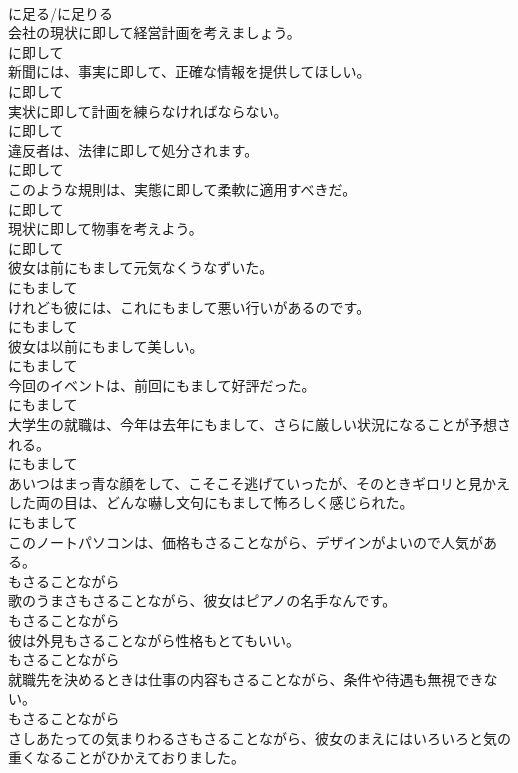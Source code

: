 \documentclass[8pt]{extreport}
\begin{document}
\begin{CJK}{UTF8}{min}
\\	に足る/に足りる	
\\	会社の現状に即して経営計画を考えましょう。	
\\	に即して	
\\	新聞には、事実に即して、正確な情報を提供してほしい。	
\\	に即して	
\\	実状に即して計画を練らなければならない。	
\\	に即して	
\\	違反者は、法律に即して処分されます。	
\\	に即して	
\\	このような規則は、実態に即して柔軟に適用すべきだ。	
\\	に即して	
\\	現状に即して物事を考えよう。	
\\	に即して	
\\	彼女は前にもまして元気なくうなずいた。	
\\	にもまして	
\\	けれども彼には、これにもまして悪い行いがあるのです。	
\\	にもまして	
\\	彼女は以前にもまして美しい。	
\\	にもまして	
\\	今回のイベントは、前回にもまして好評だった。	
\\	にもまして	
\\	大学生の就職は、今年は去年にもまして、さらに厳しい状況になることが予想される。	
\\	にもまして	
\\	あいつはまっ青な顔をして、こそこそ逃げていったが、そのときギロリと見かえした両の目は、どんな嚇し文句にもまして怖ろしく感じられた。	
\\	にもまして	
\\	このノートパソコンは、価格もさることながら、デザインがよいので人気がある。	
\\	もさることながら	
\\	歌のうまさもさることながら、彼女はピアノの名手なんです。	
\\	もさることながら	
\\	彼は外見もさることながら性格もとてもいい。	
\\	もさることながら	
\\	就職先を決めるときは仕事の内容もさることながら、条件や待遇も無視できない。	
\\	もさることながら	
\\	さしあたっての気まりわるさもさることながら、彼女のまえにはいろいろと気の重くなることがひかえておりました。	

\end{CJK}
\end{document}
